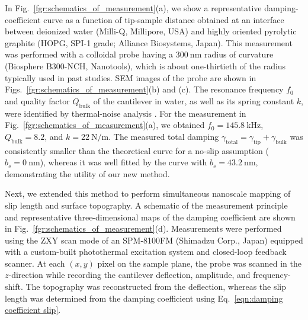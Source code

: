 \documentclass[journal=jacsat,manuscript=article]{achemso}
\begin{document}
In Fig.~\ref{fgr:schematics_of_measurement}(a), we show a representative damping-coefficient curve as a function of tip-sample distance obtained at an interface between deionized water (Milli-Q, Millipore, USA) and highly oriented pyrolytic graphite (HOPG, SPI-1 grade; Alliance Biosystems, Japan). This measurement was performed with a colloidal probe having a \(\SI{300}{\nano\metre}\) radius of curvature (Biosphere B300-NCH, Nanotools), which is about one-thirtieth of the radius typically used in past studies. SEM images of the probe are shown in Figs.~\ref{fgr:schematics_of_measurement}(b) and (c). The resonance frequency \(f_0\) and quality factor \(Q_{\text{bulk}}\) of the cantilever in water, as well as its spring constant \(k\), were identified by thermal-noise analysis \cite{Butt1995-nx, Pottier2017-ch}. For the measurement in Fig.~\ref{fgr:schematics_of_measurement}(a), we obtained \(f_0 = \SI{145.8}{\kilo\hertz}\), \(Q_{\text{bulk}} = 8.2\), and \(k = \SI{22}{\newton\per\metre}\). The measured total damping \(\gamma_{\text{total}}=\gamma_{\text{tip}}+\gamma_{\text{bulk}}\) was consistently smaller than the theoretical curve for a no-slip assumption (\(b_s = \SI{0}{\nano\metre}\)), whereas it was well fitted by the curve with \(b_s = \SI{43.2}{\nano\metre}\), demonstrating the utility of our new method.

Next, we extended this method to perform simultaneous nanoscale mapping of slip length and surface topography. A schematic of the measurement principle and representative three-dimensional maps of the damping coefficient are shown in Fig.~\ref{fgr:schematics_of_measurement}(d). Measurements were performed using the ZXY scan mode of an SPM-8100FM (Shimadzu Corp., Japan) equipped with a custom-built photothermal excitation system and closed-loop feedback scanner. At each \((x, y)\) pixel on the sample plane, the probe was scanned in the \(z\)-direction while recording the cantilever deflection, amplitude, and frequency-shift. The topography was reconstructed from the deflection, whereas the slip length was determined from the damping coefficient using Eq.~\ref{eqn:damping coefficient slip}. 
\end{document}
